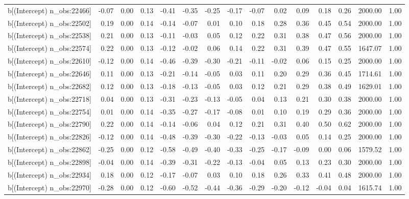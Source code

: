 \begin{table}[ht]
\begin{tabular}{rrrrrrrrrrrrrrr}
  b[(Intercept) n\_obs:22466] & -0.07 & 0.00 & 0.13 & -0.41 & -0.35 & -0.25 & -0.17 & -0.07 & 0.02 & 0.09 & 0.18 & 0.26 & 2000.00 & 1.00 \\ 
  b[(Intercept) n\_obs:22502] & 0.19 & 0.00 & 0.14 & -0.14 & -0.07 & 0.01 & 0.10 & 0.18 & 0.28 & 0.36 & 0.45 & 0.54 & 2000.00 & 1.00 \\ 
  b[(Intercept) n\_obs:22538] & 0.21 & 0.00 & 0.13 & -0.11 & -0.03 & 0.05 & 0.12 & 0.22 & 0.31 & 0.38 & 0.47 & 0.56 & 2000.00 & 1.00 \\ 
  b[(Intercept) n\_obs:22574] & 0.22 & 0.00 & 0.13 & -0.12 & -0.02 & 0.06 & 0.14 & 0.22 & 0.31 & 0.39 & 0.47 & 0.55 & 1647.07 & 1.00 \\ 
  b[(Intercept) n\_obs:22610] & -0.12 & 0.00 & 0.14 & -0.46 & -0.39 & -0.30 & -0.21 & -0.11 & -0.02 & 0.06 & 0.15 & 0.25 & 2000.00 & 1.00 \\ 
  b[(Intercept) n\_obs:22646] & 0.11 & 0.00 & 0.13 & -0.21 & -0.14 & -0.05 & 0.03 & 0.11 & 0.20 & 0.29 & 0.36 & 0.45 & 1714.61 & 1.00 \\ 
  b[(Intercept) n\_obs:22682] & 0.12 & 0.00 & 0.13 & -0.18 & -0.13 & -0.05 & 0.03 & 0.12 & 0.21 & 0.29 & 0.38 & 0.49 & 1629.01 & 1.00 \\ 
  b[(Intercept) n\_obs:22718] & 0.04 & 0.00 & 0.13 & -0.31 & -0.23 & -0.13 & -0.05 & 0.04 & 0.13 & 0.21 & 0.30 & 0.38 & 2000.00 & 1.00 \\ 
  b[(Intercept) n\_obs:22754] & 0.01 & 0.00 & 0.14 & -0.35 & -0.27 & -0.17 & -0.08 & 0.01 & 0.10 & 0.19 & 0.29 & 0.36 & 2000.00 & 1.00 \\ 
  b[(Intercept) n\_obs:22790] & 0.22 & 0.00 & 0.14 & -0.14 & -0.06 & 0.04 & 0.12 & 0.21 & 0.31 & 0.40 & 0.50 & 0.62 & 2000.00 & 1.00 \\ 
  b[(Intercept) n\_obs:22826] & -0.12 & 0.00 & 0.14 & -0.48 & -0.39 & -0.30 & -0.22 & -0.13 & -0.03 & 0.05 & 0.14 & 0.25 & 2000.00 & 1.00 \\ 
  b[(Intercept) n\_obs:22862] & -0.25 & 0.00 & 0.12 & -0.58 & -0.49 & -0.40 & -0.33 & -0.25 & -0.17 & -0.09 & 0.00 & 0.06 & 1579.52 & 1.00 \\ 
  b[(Intercept) n\_obs:22898] & -0.04 & 0.00 & 0.14 & -0.39 & -0.31 & -0.22 & -0.13 & -0.04 & 0.05 & 0.13 & 0.23 & 0.30 & 2000.00 & 1.00 \\ 
  b[(Intercept) n\_obs:22934] & 0.18 & 0.00 & 0.12 & -0.17 & -0.07 & 0.03 & 0.10 & 0.18 & 0.26 & 0.33 & 0.41 & 0.48 & 2000.00 & 1.00 \\ 
  b[(Intercept) n\_obs:22970] & -0.28 & 0.00 & 0.12 & -0.60 & -0.52 & -0.44 & -0.36 & -0.29 & -0.20 & -0.12 & -0.04 & 0.04 & 1615.74 & 1.00 \\ 

\end{tabular}
\end{table}
